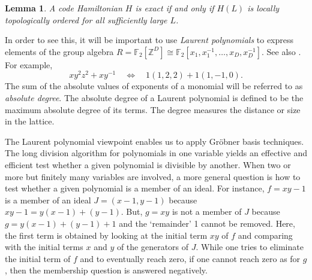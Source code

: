 \documentclass[letterpaper,12pt]{amsart}
\newtheorem{lem}{Lemma}[section]
\theoremstyle{definition} \newtheorem{defn}{Definition}
\theoremstyle{definition} \newtheorem{rem}{Remark}
\theoremstyle{definition} \newtheorem{example}{Example}
\newcommand{\FF}{\mathbb{F}}
\begin{document}
\begin{lem}
A code Hamiltonian $H$ is exact
if and only if $H(L)$ is locally topologically ordered for
all sufficiently large $L$.
\label{lem:local-tqo=exact}
\end{lem}
In order to see this, it will be important to use {\em Laurent polynomials}
to express elements of the group algebra 
$R = \FF_2[\mathbb{Z}^D] \cong \FF_2[x_1,x_1^{-1},\ldots,x_D,x_D^{-1}]$.
See also \cite{GueneriOezbudak2008}.
For example, 
\[
 x y^2 z^2 + x y^{-1} \quad \Longleftrightarrow \quad 1(1,2,2)+1(1,-1,0) .
\]
The sum of the absolute values of exponents of a monomial will be referred to as {\em absolute degree}.
The absolute degree of a Laurent polynomial is defined to be the maximum absolute degree of its terms.
The degree measures the distance or size in the lattice.


The Laurent polynomial viewpoint enables us to apply Gr\"obner basis techniques.
The long division algorithm for polynomials in one variable yields an effective and efficient
test whether a given polynomial is divisible by another.
When two or more but finitely many variables are involved,
a more general question is how to test
whether a given polynomial is a member of an ideal.
For instance, $f=xy-1$ is a member of an ideal $J = (x-1,y-1)$
because $xy -1 = y(x-1) + (y-1)$.
But, $g=xy$ is not a member of $J$ because $g = y(x-1) + (y-1) + 1$ and the `remainder' 1 cannot be removed.
Here, the first term is obtained by looking at the initial term $xy$ of $f$
and comparing with the initial terms $x$ and $y$ of the generators of $J$.
While one tries to eliminate the initial term of $f$ and to eventually reach zero,
if one cannot reach zero as for $g$, then the membership question is answered negatively.
\end{document}
